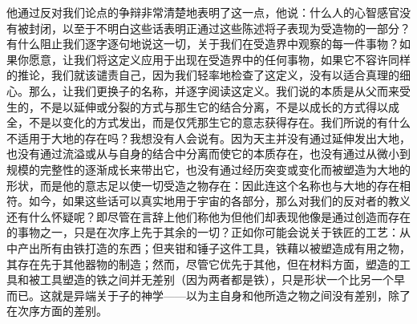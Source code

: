 他通过反对我们论点的争辩非常清楚地表明了这一点，他说：什么人的心智感官没有被封闭，以至于不明白这些话表明正通过这些陈述将子表现为受造物的一部分？有什么阻止我们逐字逐句地说这一切，关于我们在受造界中观察的每一件事物？如果你愿意，让我们将这定义应用于出现在受造界中的任何事物，如果它不容许同样的推论，我们就该谴责自己，因为我们轻率地检查了这定义，没有以适合真理的细心。那么，让我们更换子的名称，并逐字阅读这定义。我们说的本质是从父而来受生的，不是以延伸或分裂的方式与那生它的结合分离，不是以成长的方式得以成全，不是以变化的方式发出，而是仅凭那生它的意志获得存在。我们所说的有什么不适用于大地的存在吗？我想没有人会说有。因为天主并没有通过延伸发出大地，也没有通过流溢或从与自身的结合中分离而使它的本质存在，也没有通过从微小到规模的完整性的逐渐成长来带出它，也没有通过经历突变或变化而被塑造为大地的形状，而是他的意志足以使一切受造之物存在：因此连这个名称也与大地的存在相符。如今，如果这些话可以真实地用于宇宙的各部分，那么对我们的反对者的教义还有什么怀疑呢？即尽管在言辞上他们称他为但他们却表现他像是通过创造而存在的事物之一，只是在次序上先于其余的一切？正如你可能会说关于铁匠的工艺：从中产出所有由铁打造的东西；但夹钳和锤子这件工具，铁藉以被塑造成有用之物，其存在先于其他器物的制造；然而，尽管它优先于其他，但在材料方面，塑造的工具和被工具塑造的铁之间并无差别（因为两者都是铁），只是形状一个比另一个早而已。这就是异端关于子的神学——以为主自身和他所造之物之间没有差别，除了在次序方面的差别。\par

